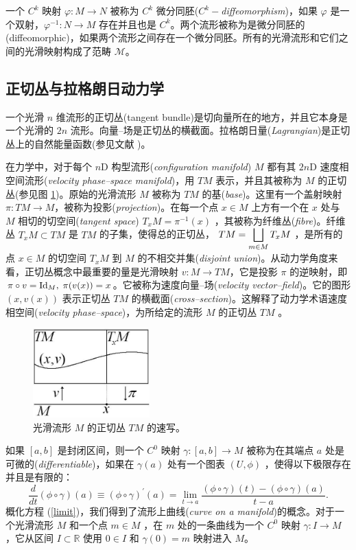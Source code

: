 \documentclass[11pt,fontset=founder]{ctexart}
\begin{document}
一个 $C^{k}$ 映射 $\varphi :M\rightarrow N$ 被称为 $C^{k}$ 微分同胚($C^{k}-$\textit{diffeomorphism})，如果 $\varphi $ 是一个双射，$\varphi ^{-1}:N\rightarrow M$ 存在并且也是 $C^{k}$。两个流形被称为是微分同胚的(diffeomorphic)，如果两个流形之间存在一个微分同胚。所有的光滑流形和它们之间的光滑映射构成了范畴 $\mathcal{M}$。

\subsection{正切丛与拉格朗日动力学}

一个光滑 $n$ 维流形的正切丛(tangent bundle)是切向量所在的地方，并且它本身是一个光滑的 $2n$ 流形。向量–场是正切丛的横截面。拉格朗日量(\textit{Lagrangian})是正切丛上的自然能量函数(参见文献 \cite{GaneshSprBig,GaneshADG})。

在力学中，对于每个 $n$D 构型流形(\textit{configuration manifold}) $M$ 都有其 $2n$D 速度相空间流形(\textit{velocity phase--space manifold})，用 $TM$ 表示，并且其被称为 $M$ 的正切丛(参见图 \ref{TBun1})。原始的光滑流形 $M$ 被称为 $TM$ 的基(\emph{base})。这里有一个盖射映射 $\pi:TM\rightarrow M$，被称为投影(\emph{projection})。在每一个点 $x\in M$ 上方有一个在 $x$ 处与 $M$ 相切的切空间(\textit{tangent space}) $T_x M=\pi^{-1}(x)$ ，其被称为纤维丛(\textit{fibre})。纤维丛 $T_x M\subset TM$ 是 $TM$ 的子集，使得总的正切丛， $TM=\mathop{\displaystyle \bigsqcup }\limits_{m\in M}T_x M$ ，是所有的点 $x\in M$ 的切空间 $T_x M$ 到 $M$ 的不相交并集(\emph{disjoint union})。从动力学角度来看，正切丛概念中最重要的量是光滑映射 $v:M\rightarrow TM$，它是投影 $\pi$ 的逆映射，即 $\pi\circ v=\func{Id}_M,\;\pi(v(x))=x$。它被称为速度向量–场(\textit{velocity vector--field})。它的图形 $(x,v(x))$ 表示正切丛 $TM$ 的横截面(\textit{cross--section})。这解释了动力学术语速度相空间(\textit{velocity phase--space})，为所给定的流形 $M$ 的正切丛 $TM$ 。
\begin{figure}[h]
\centerline{\includegraphics[width=4.5cm]{TanBundle1}}
\caption{光滑流形 $M$ 的正切丛 $TM$ 的速写。}
\label{TBun1}
\end{figure}

如果 $[a,b]$ 是封闭区间，则一个 $C^{0}$ 映射 $\gamma :[a,b]\rightarrow M$ 被称为在其端点 $a$ 处是可微的(\emph{differentiable})，如果在 $\gamma (a)$ 处有一个图表 $( U,\phi ) $ ，使得以下极限存在并且是有限的：
\begin{equation}
{\frac{d}{dt}}(\phi \circ \gamma )(a)\equiv(\phi \circ \gamma )^{\prime
}(a)=\lim_{t\rightarrow a}\frac{(\phi \circ \gamma )(t)-(\phi \circ \gamma
)(a)}{t-a}.  \label{limit}
\end{equation}
概化方程 (\ref{limit})，我们得到了流形上曲线(\emph{curve on a manifold})的概念。对于一个光滑流形 $M$ 和一个点 $m\in M$ ，在 $m$ 处的一条曲线为一个 $C^{0}$ 映射 $\gamma :I\rightarrow M$ ，它从区间 $I\subset \mathbb{R}$ 使用 $0\in I$ 和 $\gamma (0)=m$ 映射进入 $M$。
\end{document}
